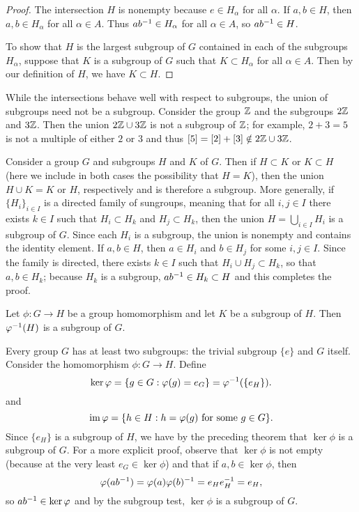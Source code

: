 \begin{proof}
    The intersection \(H\) is nonempty because \(e \in H_\alpha\) for all
    \(\alpha\). If \(a, b \in H\), then \(a, b \in H_\alpha\) for all \(\alpha
    \in A\). Thus \(ab^{-1} \in H_\alpha\) for all \(\alpha \in A\), so \(ab^{-1}
    \in H\).

    To show that \(H\) is the largest subgroup of \(G\) contained in each of the
    subgroups \(H_{\alpha}\), suppose that \(K\) is a subgroup of \(G\) such
    that \(K \subset H_{\alpha}\) for all \(\alpha \in A\). Then by our
    definition of \(H\), we have \(K \subset H\).
\end{proof}

\begin{example}
    While the intersections behave well with respect to subgroups, the union of
    subgroups need not be a subgroup. Consider the group \(\mathbb{Z}\) and the
    subgroups \(2\mathbb{Z}\) and \(3\mathbb{Z}\). Then the union \(2\mathbb{Z} \cup 3\mathbb{Z}\) is not a
    subgroup of \(\mathbb{Z}\); for example, \(2 + 3 = 5\) is not a multiple of either
    \(2\) or \(3\) and thus \([5] = [2] + [3] \notin 2\mathbb{Z} \cup 3\mathbb{Z}\).

    Consider a group \(G\) and subgroups \(H\) and \(K\) of \(G\). Then if \(H
    \subset K\) or \(K \subset H\) (here we include in both cases the
    possibility that \(H = K\)), then the union \(H \cup K = K\) or \(H\),
    respectively and is therefore a subgroup. More generally, if \(\{H_i\}_{i
    \in I}\) is a directed family of sungroups, meaning that for all \(i, j \in
    I\) there exists \(k \in I\) such that \(H_i \subset H_k\) and \(H_j \subset
    H_k\), then the union \(H = \bigcup_{i \in I} H_i\) is a subgroup of \(G\).
    Since each \(H_i\) is a subgroup, the union is nonempty and contains the
    identity element. If \(a, b \in H\), then \(a \in H_i\) and \(b \in H_j\)
    for some \(i, j \in I\). Since the family is directed, there exists \(k \in
    I\) such that \(H_i \cup H_j \subset H_k\), so that \(a, b \in H_k\);
    because \(H_k\) is a subgroup, \(ab^{-1} \in H_k \subset H\) and this
    completes the proof.
\end{example}

\begin{theorem}
    \label{thm:preimage-subgroup}
    Let \(\phi: G \to H\) be a group homomorphism and let \(K\) be a subgroup of
    \(H\). Then \(\varphi^{-1}(H)\) is a subgroup of \(G\).
\end{theorem}


Every group \(G\) has at least two subgroups: the trivial subgroup \(\{e\}\) and
\(G\) itself. Consider the homomorphism \(\phi: G \to H\). Define
\[
    \ker \varphi = \{g \in G : \varphi(g) = e_G\} = \varphi^{-1}(\{e_H\}).
\]
and
\[
    \operatorname{im} \varphi = \{h \in H : h = \varphi(g) \text{ for some } g \in G\}.
\]
Since \(\{e_H\}\) is a subgroup of \(H\), we have by the preceding theorem that
\(\ker \phi\) is a subgroup of \(G\). For a more explicit proof, observe that
\(\ker \phi\) is not empty (because at the very least \(e_G \in \ker \phi\)) and
that if \(a, b \in \ker \phi\), then 
\[
    \varphi(ab^{-1}) = \varphi(a)\varphi(b)^{-1} = e_H e_H^{-1} = e_H,
\]
so \(ab^{-1} \in \ker \varphi\) and by the subgroup test, \(\ker \phi\) is a
subgroup of \(G\).

